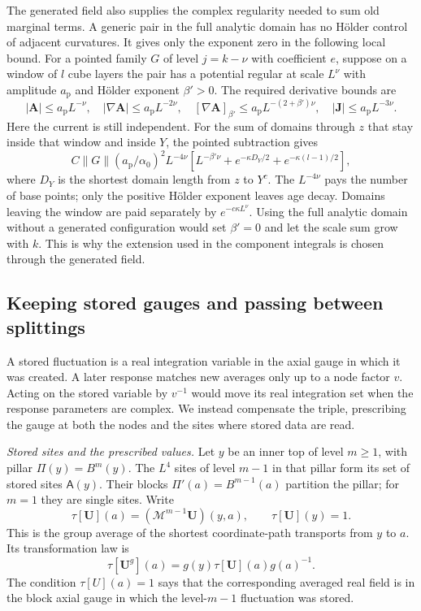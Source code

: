 \documentclass[11pt,letterpaper,reqno]{amsart}
\theoremstyle{definition}
\theoremstyle{remark}
\begin{document}
The generated field also
supplies the complex
regularity needed to sum
old marginal terms. A
generic pair in the full
analytic domain has no
H\"older control of adjacent
curvatures. It gives only
the exponent zero in the
following local bound.
For a pointed family $G$
of level $j=k-\nu$ with
coefficient $e$, suppose on
a window of $l$ cube layers
the pair has a potential
regular at scale $L^\nu$
with amplitude $a_{\mathrm p}$
and H\"older exponent
$\beta'>0$. The required
derivative bounds are
\[
 |\mathbf A|\le a_{\mathrm p}L^{-\nu},\quad
 |\nabla\mathbf A|\le a_{\mathrm p}L^{-2\nu},\quad
 [\nabla\mathbf A]_{\beta'}
        \le a_{\mathrm p}L^{-(2+\beta')\nu},\quad
 |\mathbf J|\le a_{\mathrm p}L^{-3\nu}.
\]
Here the current is still
independent. For the sum of
domains through $z$ that
stay inside that window and
inside $Y$, the pointed
subtraction gives
\begin{equation}\label{eq:xrg-complex-pointed-window}
 C\|G\|(a_{\mathrm p}/\alpha_0)^2L^{-4\nu}
  \left[L^{-\beta'\nu}
       +e^{-\kappa D_Y/2}+e^{-\kappa(l-1)/2}\right],
\end{equation}
where $D_Y$ is the shortest
domain length from $z$ to
$Y^c$. The $L^{-4\nu}$
pays the number of base
points; only the positive
H\"older exponent leaves
age decay. Domains leaving
the window are paid
separately by
$e^{-c\kappa L^\nu}$.
Using the full analytic
domain without a generated
configuration would set
$\beta'=0$ and let the
scale sum grow with $k$.
This is why the extension
used in the component
integrals is chosen through
the generated field.

\subsection{Keeping stored gauges and passing between splittings}

A stored fluctuation is a real integration variable in the axial
gauge in which it was created. A later response matches new
averages only up to a node factor \(v\). Acting on the stored
variable by \(v^{-1}\) would move its real integration set when
the response parameters are complex. We instead compensate the
triple, prescribing the gauge at both the nodes and the sites
where stored data are read.

\emph{Stored sites and the prescribed values.}
Let \(y\) be an inner top of level \(m\ge1\), with pillar
\(\Pi(y)=B^m(y)\). The \(L^4\) sites of level \(m-1\) in that
pillar form its set of stored sites \(\mathsf A(y)\). Their
blocks \(\Pi'(a)=B^{m-1}(a)\) partition the pillar; for \(m=1\)
they are single sites. Write
\[
 \tau[\mathbf U](a)=(\mathcal M^{m-1}\mathbf U)(y,a),
 \qquad \tau[\mathbf U](y)=1.
\]
This is the group average of the shortest coordinate-path
transports from \(y\) to \(a\). Its transformation law is
\[
 \tau[\mathbf U^g](a)
       =g(y)\tau[\mathbf U](a)g(a)^{-1}.
\]
The condition \(\tau[U](a)=1\) says that the corresponding
averaged real field is in the block axial gauge in which the
level-\(m-1\) fluctuation was stored.
\end{document}
